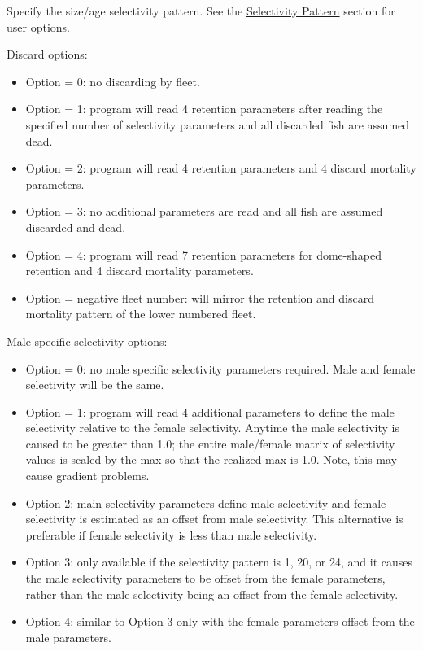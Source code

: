 Specify the size/age selectivity pattern. See the \hyperlink{SelexPattern}{Selectivity Pattern} section for user options.

\hypertarget{DomeRetention}{Discard options:}
\begin{itemize}
	\item Option = 0: no discarding by fleet.
	\item Option = 1: program will read 4 retention parameters after reading the specified number of selectivity parameters and all discarded fish are assumed dead.
	\item Option = 2: program will read 4 retention parameters and 4 discard mortality parameters.
	\item Option = 3: no additional parameters are read and all fish are assumed discarded and dead.
	\item Option = 4: program will read 7 retention parameters for dome-shaped retention and 4 discard mortality parameters.
	\item Option = negative fleet number: will mirror the retention and discard mortality pattern of the lower numbered fleet.
\end{itemize}

Male specific selectivity options:
\begin{itemize}
	\item Option = 0: no male specific selectivity parameters required. Male and female selectivity will be the same.
	\item Option = 1: program will read 4 additional parameters to define the male selectivity relative to the female selectivity. Anytime the male selectivity is caused to be greater than 1.0; the entire male/female matrix of selectivity values is scaled by the max so that the realized max is 1.0. Note, this may cause gradient problems.
	\item Option 2: main selectivity parameters define male selectivity and female selectivity is estimated as an offset from male selectivity. This alternative is preferable if female selectivity is less than male selectivity.
	\item Option 3: only available if the selectivity pattern is 1, 20, or 24, and it causes the male selectivity parameters to be offset from the female parameters, rather than the male selectivity being an offset from the female selectivity.
	\item Option 4: similar to Option 3 only with the female parameters offset from the male parameters.
\end{itemize}

